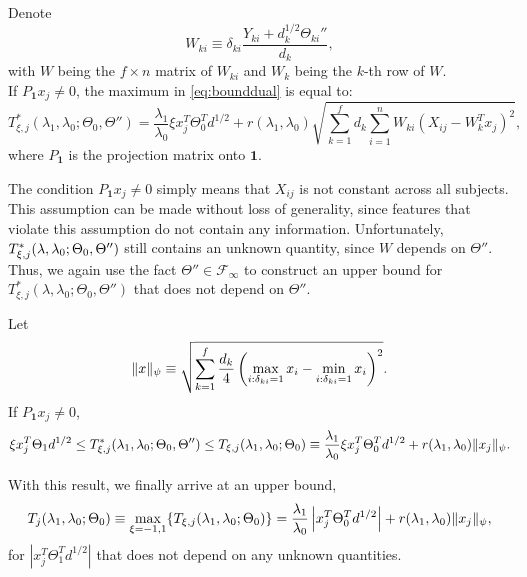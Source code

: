 \begin{lemma}
    \label{lem:3}
    Denote
    \begin{equation}
        \label{eq:w}
        W_{ki}\equiv\delta_{ki}\frac{Y_{ki}+d_k^{1/2}\Theta_{ki}''}{d_k},
    \end{equation}
    with $W$ being the $f\times n$ matrix of $W_{ki}$ and $W_k$ being the $k$-th row of $W$.\\
    If $P_{\mathbf{1}}x_j\neq 0$, the maximum in \eqref{eq:bounddual} is equal to:
    \begin{equation}
        \label{eq:tstar}
        T^*_{\xi,j}(\lambda_1,\lambda_0;\Theta_{0},\Theta'')=\frac{\lambda_1}{\lambda_0}\xi x_j^T\Theta_{0}^Td^{1/2}+r(\lambda_1,\lambda_0)\sqrt{\sum_{k=1}^fd_k\sum_{i=1}^nW_{ki}\left(X_{ij}-W_k^Tx_j\right)^2},
    \end{equation}
    where $P_{\mathbf{1}}$ is the projection matrix onto $\mathbf{1}$.
\end{lemma}

The condition $P_{\mathbf{1}}x_j \ne 0$ simply means that $X_{ij}$ is not constant across all subjects. This assumption can be made without loss of generality, since features that violate this assumption do not contain any information. Unfortunately, $\\T^*_{\xi,j}(\lambda,\lambda_0;\Theta_{0},\Theta'')$ still contains an unknown quantity, since $W$ depends on $\Theta''$. Thus, we again use the fact $\Theta''\in\mathcal{F}_\infty$ to construct an upper bound for $T^*_{\xi,j}(\lambda,\lambda_0;\Theta_{0},\Theta'')$ that does not depend on $\Theta''$.

\begin{theorem}
    \label{thm:2}
    Let
    \begin{equation}
        \label{eq:prod}
        \lVert x\rVert_\psi\equiv\sqrt{\sum_{k=1}^f\frac{d_k}{4}\left(\max_{i:\delta_{ki}=1}x_i-\min_{i:\delta_{ki}=1}x_i\right)^2}.
    \end{equation}
    If $P_{\mathbf{1}}x_j\neq 0$,
    \begin{equation}
        \label{eq:gbbar}
        \xi x_j^T\Theta_{1}d^{1/2}\leq T^*_{\xi,j}(\lambda_1,\lambda_0;\Theta_{0},\Theta'')\leq T_{\xi,j}(\lambda_1,\lambda_0;\Theta_{0})\equiv\frac{\lambda_1}{\lambda_0}\xi x_j^T\Theta_{0}^Td^{1/2}+r(\lambda_1,\lambda_0)\lVert x_j\rVert_\psi.
    \end{equation}
\end{theorem}

With this result, we finally arrive at an upper bound,
\begin{equation}
    \label{eq:bound}
    T_j(\lambda_1,\lambda_0;\Theta_{0})\equiv\max_{\xi=-1,1}\{T_{\xi,j}(\lambda_1,\lambda_0;\Theta_{0})\}=\frac{\lambda_1}{\lambda_0}\left| x_j^T\Theta_{0}^Td^{1/2}\right|+r(\lambda_1,\lambda_0)\lVert x_j\rVert_\psi,
\end{equation}
for $|x_j^T\Theta^T_{1}d^{1/2}|$ that does not depend on any unknown quantities. 

